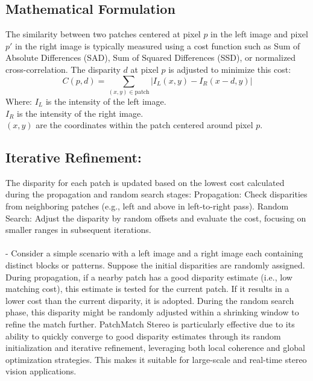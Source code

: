 \documentclass[22pt]{report}
\begin{document}
\subsection{Mathematical Formulation}
The similarity between two patches centered at pixel \( p \) in the left image and pixel \( p' \) in the right image is typically measured using a cost function such as Sum of Absolute Differences (SAD), Sum of Squared Differences (SSD), or normalized cross-correlation. The disparity \( d \) at pixel \( p \) is adjusted to minimize this cost: \[ C(p,d) = \sum_{(x,y) \in \text{patch}} |I_L(x,y) - I_R(x-d,y)| \] Where: \( I_L \) is the intensity of the left image. \\ \( I_R \) is the intensity of the right image. \\ \( (x,y) \) are the coordinates within the patch centered around pixel \( p \).
\vspace{15}
\subsection{\textbf{Iterative Refinement:}}
The disparity for each patch is updated based on the lowest cost calculated during the propagation and random search stages: Propagation: Check disparities from neighboring patches (e.g., left and above in left-to-right pass). Random Search: Adjust the disparity by random offsets and evaluate the cost, focusing on smaller ranges in subsequent iterations. \\ \\
- Consider a simple scenario with a left image and a right image each containing distinct blocks or patterns. Suppose the initial disparities are randomly assigned. During propagation, if a nearby patch has a good disparity estimate (i.e., low matching cost), this estimate is tested for the current patch. If it results in a lower cost than the current disparity, it is adopted. During the random search phase, this disparity might be randomly adjusted within a shrinking window to refine the match further.
PatchMatch Stereo is particularly effective due to its ability to quickly converge to good disparity estimates through its random initialization and iterative refinement, leveraging both local coherence and global optimization strategies. This makes it suitable for large-scale and real-time stereo vision applications.
\end{document}
